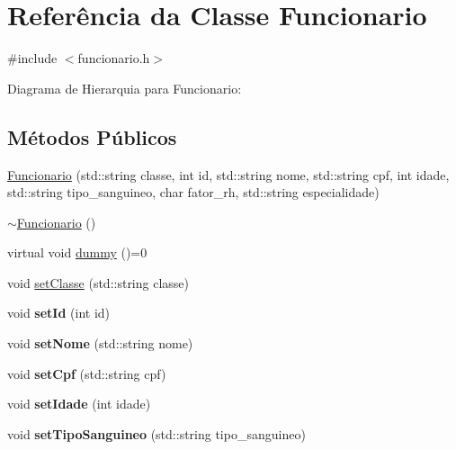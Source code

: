 \hypertarget{classFuncionario}{}\section{Referência da Classe Funcionario}
\label{classFuncionario}


{\ttfamily \#include $<$funcionario.\+h$>$}



Diagrama de Hierarquia para Funcionario\+:
\subsection*{Métodos Públicos}
\begin{DoxyCompactItemize}
\item 
\hyperlink{classFuncionario_a16417baaad7842cbbf9970a4f677d3bc}{Funcionario} (std\+::string classe, int id, std\+::string nome, std\+::string cpf, int idade, std\+::string tipo\+\_\+sanguineo, char fator\+\_\+rh, std\+::string especialidade)
\item 
\hyperlink{classFuncionario_a800273bd909dc88f821a414abebc442c}{$\sim$\+Funcionario} ()
\item 
virtual void \hyperlink{classFuncionario_a56aa6d780ba9ac728fad0cde3a71e9d8}{dummy} ()=0
\item 
void \hyperlink{classFuncionario_a1e05d112b5e3068dbeeba284d97b6b81}{set\+Classe} (std\+::string classe)
\item 
\mbox{\label{classFuncionario_acc0b430d08b2c459682d7bb01c0ab1c4}} 
void {\bfseries set\+Id} (int id)
\item 
\mbox{\label{classFuncionario_a32e01bd23e422ab7598cd04dac51eb82}} 
void {\bfseries set\+Nome} (std\+::string nome)
\item 
\mbox{\label{classFuncionario_a4fd103578189cdce84cd0f76f6c668fd}} 
void {\bfseries set\+Cpf} (std\+::string cpf)
\item 
\mbox{\label{classFuncionario_aa3904b7bb732df7ef4f7c713db45e077}} 
void {\bfseries set\+Idade} (int idade)
\item 
\mbox{\label{classFuncionario_a8213b1048482411187cf076d6fc27719}} 
void {\bfseries set\+Tipo\+Sanguineo} (std\+::string tipo\+\_\+sanguineo)

\end{DoxyCompactItemize}
